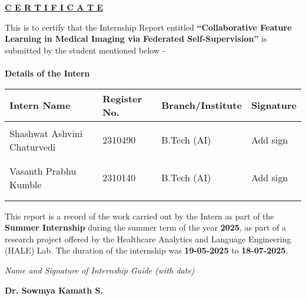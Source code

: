 \documentclass[a4paper, 10 pt, conference]{ieeeconf}
\begin{document}
{\large
\vspace{2em}
\begin{center}
\large{\textbf{\underline{C E R T I F I C A T E}}}
\end{center}

\vspace{3em}
This is to certify that the Internship Report entitled {\color{red}\textbf{``Collaborative Feature Learning in Medical Imaging via Federated Self-Supervision''}} is submitted by the student mentioned below -
\\ \\

{\large\textbf{Details of the Intern}} \\ %

\begin{center}
\begin{tabular}{ m{5.3cm}  m{3cm} m{4cm}  m{1.7cm}}
\hline
Intern Name & Register No. & Branch/Institute  & Signature	\\ \hline
\\
{\color{red}Shashwat Ashvini Chaturvedi }		&  {\color{red}2310490}		&  {\color{red}B.Tech (AI)}	 &  {\color{red}Add sign}						\\\\\\
{\color{red}Vasanth Prabhu Kumble}		&  {\color{red}2310140}		&  {\color{red}B.Tech (AI)}	 &  {\color{red}Add sign}						\\\\\\
\hline
\end{tabular} 
\end{center} 

\vspace{3em}
This report is a record of the work carried out by the Intern as part of the \textbf{Summer Internship} during the summer term of the year \textbf{2025}, as part of a research project offered by the Healthcare Analytics and Language Engineering (HALE) Lab. The duration of the internship was \textbf{19-05-2025} to \textbf{18-07-2025}.
\newline
\newline
\newline
\newline

 \hfill \textit{Name and Signature of Internship Guide \textit{(with date)}}
\null
\null
\null

\hfill {\large\textbf{Dr. Sowmya Kamath S.}}
}
\end{document}
